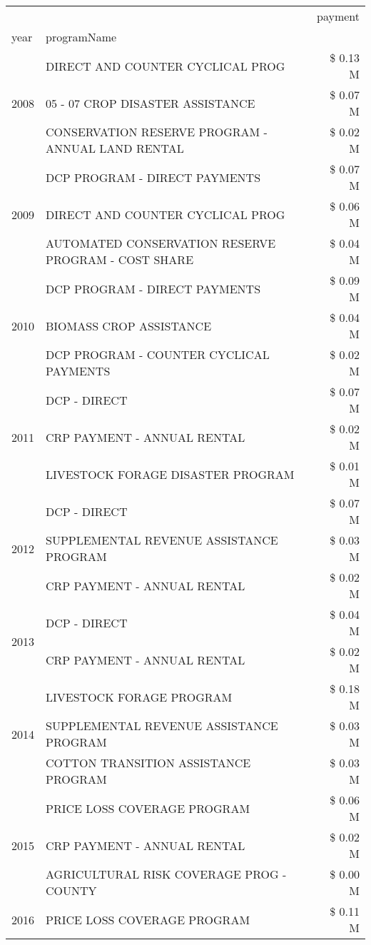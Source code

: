 \begin{tabular}{llr}
\toprule
 &  & payment \\
year & programName &  \\
\midrule
\multirow[t]{3}{*}{2008} & DIRECT AND COUNTER CYCLICAL PROG & \$ 0.13 M \\
 & 05 - 07 CROP DISASTER ASSISTANCE & \$ 0.07 M \\
 & CONSERVATION RESERVE PROGRAM - ANNUAL LAND RENTAL & \$ 0.02 M \\
\cline{1-3}
\multirow[t]{3}{*}{2009} & DCP PROGRAM - DIRECT PAYMENTS & \$ 0.07 M \\
 & DIRECT AND COUNTER CYCLICAL PROG & \$ 0.06 M \\
 & AUTOMATED CONSERVATION RESERVE PROGRAM - COST SHARE & \$ 0.04 M \\
\cline{1-3}
\multirow[t]{3}{*}{2010} & DCP PROGRAM - DIRECT PAYMENTS & \$ 0.09 M \\
 & BIOMASS CROP ASSISTANCE & \$ 0.04 M \\
 & DCP PROGRAM - COUNTER CYCLICAL PAYMENTS & \$ 0.02 M \\
\cline{1-3}
\multirow[t]{3}{*}{2011} & DCP - DIRECT & \$ 0.07 M \\
 & CRP PAYMENT - ANNUAL RENTAL & \$ 0.02 M \\
 & LIVESTOCK FORAGE DISASTER PROGRAM & \$ 0.01 M \\
\cline{1-3}
\multirow[t]{3}{*}{2012} & DCP - DIRECT & \$ 0.07 M \\
 & SUPPLEMENTAL REVENUE ASSISTANCE PROGRAM & \$ 0.03 M \\
 & CRP PAYMENT - ANNUAL RENTAL & \$ 0.02 M \\
\cline{1-3}
\multirow[t]{2}{*}{2013} & DCP - DIRECT & \$ 0.04 M \\
 & CRP PAYMENT - ANNUAL RENTAL & \$ 0.02 M \\
\cline{1-3}
\multirow[t]{3}{*}{2014} & LIVESTOCK FORAGE PROGRAM & \$ 0.18 M \\
 & SUPPLEMENTAL REVENUE ASSISTANCE PROGRAM & \$ 0.03 M \\
 & COTTON TRANSITION ASSISTANCE PROGRAM & \$ 0.03 M \\
\cline{1-3}
\multirow[t]{3}{*}{2015} & PRICE LOSS COVERAGE PROGRAM & \$ 0.06 M \\
 & CRP PAYMENT - ANNUAL RENTAL & \$ 0.02 M \\
 & AGRICULTURAL RISK COVERAGE PROG - COUNTY & \$ 0.00 M \\
\cline{1-3}
\multirow[t]{3}{*}{2016} & PRICE LOSS COVERAGE PROGRAM                   & \$ 0.11 M \\

\end{tabular}
